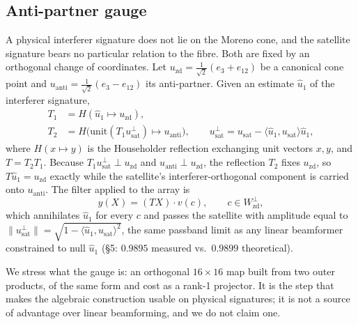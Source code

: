 \subsection{Anti-partner gauge}\label{sec:gauge}
A physical interferer signature does not lie on the Moreno cone, and the satellite signature
bears no particular relation to the fibre. Both are fixed by an orthogonal change of
coordinates. Let $u_{\mathrm{zd}}=\tfrac{1}{\sqrt2}(e_3+e_{12})$ be a canonical cone point and
$u_{\mathrm{anti}}=\tfrac{1}{\sqrt2}(e_3-e_{12})$ its anti-partner. Given an estimate
$\hat u_1$ of the interferer signature,
\begin{align}
T_1&=H(\hat u_1\mapsto u_{\mathrm{zd}}),\\
T_2&=H\bigl(\mathrm{unit}(T_1u_{\mathrm{sat}}^{\perp})\mapsto u_{\mathrm{anti}}\bigr),\qquad
u_{\mathrm{sat}}^{\perp}=u_{\mathrm{sat}}-\langle\hat u_1,u_{\mathrm{sat}}\rangle\hat u_1,
\end{align}
where $H(x\mapsto y)$ is the Householder reflection exchanging unit vectors $x,y$, and
$T=T_2T_1$. Because $T_1u_{\mathrm{sat}}^\perp\perp u_{\mathrm{zd}}$ and
$u_{\mathrm{anti}}\perp u_{\mathrm{zd}}$, the reflection $T_2$ fixes $u_{\mathrm{zd}}$, so
$T\hat u_1=u_{\mathrm{zd}}$ exactly while the satellite's interferer-orthogonal component is
carried onto $u_{\mathrm{anti}}$. The filter applied to the array is
\begin{equation}
y(X)=(TX)\cdot v(c),\qquad c\in W_{\mathrm{zd}}^\perp ,
\label{eq:filter}
\end{equation}
which annihilates $\hat u_1$ for every $c$ and passes the satellite with amplitude equal to
$\|u_{\mathrm{sat}}^\perp\|=\sqrt{1-\langle\hat u_1,u_{\mathrm{sat}}\rangle^2}$, the same
passband limit as any linear beamformer constrained to null $\hat u_1$ (\S5: $0.9895$
measured vs.\ $0.9899$ theoretical).

We stress what the gauge is: an orthogonal $16\times16$ map built from two outer products,
of the same form and cost as a rank-1 projector. It is the step that makes the algebraic
construction usable on physical signatures; it is not a source of advantage over linear
beamforming, and we do not claim one.

